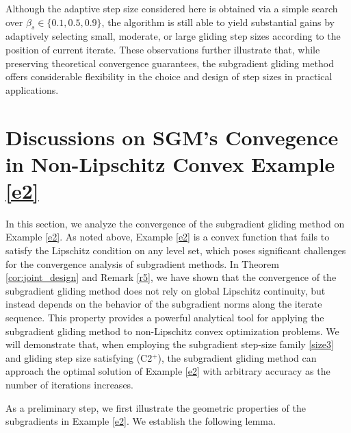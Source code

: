 \documentclass[sn-mathphys]{JORSC-jnl}%
\theoremstyle{thmstyleone}%
\theoremstyle{thmstylethree}%
\begin{document}
Although the adaptive step size considered here is obtained via a simple search over $\beta_s \in \{0.1, 0.5, 0.9\}$, the algorithm is still able to yield substantial gains by adaptively selecting small, moderate, or large gliding step sizes according to the position of current iterate. These observations further illustrate that, while preserving theoretical convergence guarantees, the subgradient gliding method offers considerable flexibility in the choice and design of step sizes in practical applications.

\section{Discussions on SGM's Convegence in Non-Lipschitz Convex Example \ref{e2} }
In this section, we analyze the convergence of the subgradient gliding method on Example \ref{e2}. As noted above, Example \ref{e2} is a convex function that fails to satisfy the Lipschitz condition on any level set, which poses significant challenges for the convergence analysis of subgradient methods. In Theorem \ref{cor:joint_design} and Remark \ref{r5}, we have shown that the convergence of the subgradient gliding method does not rely on global Lipschitz continuity, but instead depends on the behavior of the subgradient norms along the iterate sequence. This property provides a powerful analytical tool for applying the subgradient gliding method to non-Lipschitz convex optimization problems. We will demonstrate that, when employing the subgradient step-size family \eqref{size3} and gliding step size satisfying (C2$^+$), the subgradient gliding method can approach the optimal solution of Example \ref{e2} with arbitrary accuracy as the number of iterations increases.

As a preliminary step, we first illustrate the geometric properties of the subgradients in Example \ref{e2}. We establish the following lemma.
\end{document}
